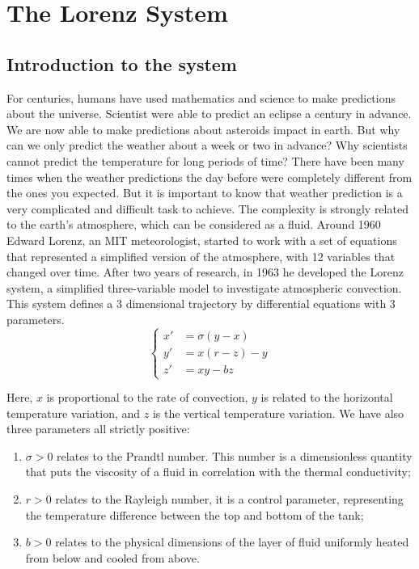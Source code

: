 \documentclass[12pt]{article}
\begin{document}
	\newpage
	
	\section{The Lorenz System}
	
	\subsection{Introduction to the system}
	
	For centuries, humans have used mathematics and science to make predictions about the universe. Scientist were able to predict an eclipse a century in advance. We are now able to make predictions about asteroids impact in earth. But why can we only predict the weather about a week or two in advance? Why scientists cannot predict the temperature for long periods of time? There have been many times when the weather predictions the day before were completely different from the ones you expected. But it is important to know that weather prediction is a very complicated and difficult task to achieve. The complexity is strongly related to the earth's atmosphere, which can be considered as a fluid. 
	Around 1960 Edward Lorenz, an MIT meteorologist, started to work with a set of equations that represented a simplified version of the atmosphere, with 12 variables that changed over time. After two years of research, in 1963 he developed the Lorenz system, a simplified three-variable model to investigate atmospheric convection. This system defines a 3 dimensional trajectory by differential equations with 3 parameters.
	$$
	\begin{cases}
		
		x'&=\sigma(y-x) \\
		y'&=x(r-z)-y \\
		z'&=xy-bz
		
	\end{cases}
	$$
	
	\noindent Here, $x$ is proportional to the rate of convection, $y$ is related to the horizontal temperature variation, and $z$ is the vertical temperature variation.
	We have also three parameters all strictly positive:
	\begin{enumerate}[label=\textbullet]
		\item $\sigma > 0$  relates to the Prandtl number. This number is a dimensionless quantity that puts the viscosity of a fluid in correlation with the thermal conductivity;
		\item $r > 0$  relates to the Rayleigh number, it is a control parameter, representing the temperature difference between the top and bottom of the tank;
		\item $b > 0$ relates to the physical dimensions of the layer of fluid uniformly heated from below and cooled from above.
	\end{enumerate}
	
\end{document}
